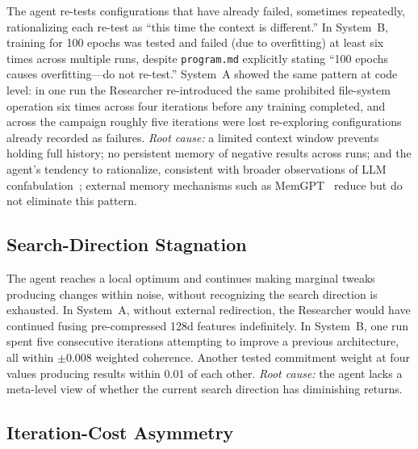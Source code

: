 \documentclass[conference]{IEEEtran}
\begin{document}
The agent re-tests configurations that have already failed, sometimes repeatedly, rationalizing each re-test as ``this time the context is different.'' In System~B, training for 100 epochs was tested and failed (due to overfitting) at least six times across multiple runs, despite \texttt{program.md} explicitly stating ``100 epochs causes overfitting---do not re-test.'' System~A showed the same pattern at code level: in one run the Researcher re-introduced the same prohibited file-system operation six times across four iterations before any training completed, and across the campaign roughly five iterations were lost re-exploring configurations already recorded as failures. \textit{Root cause:} a limited context window prevents holding full history; no persistent memory of negative results across runs; and the agent's tendency to rationalize, consistent with broader observations of LLM confabulation~\cite{ji2023hallucination}; external memory mechanisms such as MemGPT~\cite{packer2023memgpt} reduce but do not eliminate this pattern.

\subsection{Search-Direction Stagnation}

The agent reaches a local optimum and continues making marginal tweaks producing changes within noise, without recognizing the search direction is exhausted. In System~A, without external redirection, the Researcher would have continued fusing pre-compressed 128d features indefinitely. In System~B, one run spent five consecutive iterations attempting to improve a previous architecture, all within $\pm$0.008 weighted coherence. Another tested commitment weight at four values producing results within 0.01 of each other. \textit{Root cause:} the agent lacks a meta-level view of whether the current search direction has diminishing returns.

\subsection{Iteration-Cost Asymmetry}
\end{document}
